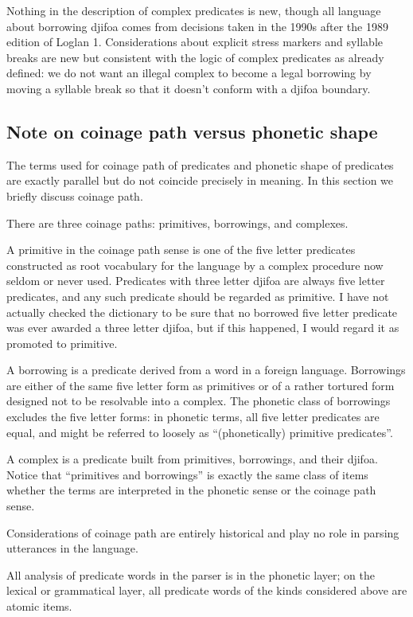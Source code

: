 \documentclass[12pt]{book}
\begin{document}
Nothing in the description of complex predicates is new, though all language about borrowing djifoa comes from decisions taken in the 1990s after the 1989 edition of Loglan 1.  Considerations about explicit stress markers and syllable breaks are new but consistent with the logic of complex predicates as already defined:  we do not want an illegal complex to become a legal borrowing by moving a syllable break so that it doesn't conform with a djifoa boundary.  

\subsection{Note on coinage path versus phonetic shape}

The terms used for coinage path of predicates and phonetic shape of predicates are exactly parallel but do not coincide precisely in meaning.  In this section we
briefly discuss coinage path.

There are three coinage paths:  primitives, borrowings, and complexes.

A primitive in the coinage path sense is one of the five letter predicates constructed as root vocabulary for the language by a complex procedure now seldom or never used.   Predicates with three letter djifoa are always five letter predicates, and any such predicate should be regarded as primitive.  I have not actually checked the dictionary to be sure that no borrowed five letter predicate was ever awarded a three letter djifoa, but if this happened, I would regard it as promoted to primitive.

A borrowing is a predicate derived from a word in a foreign language.   Borrowings are either of the same five letter form as primitives or of a rather tortured form designed not to be resolvable into a complex.   The phonetic class of borrowings excludes the five letter forms:  in phonetic terms,
all five letter predicates are equal, and might be referred to loosely as ``(phonetically) primitive predicates''.

A complex is a predicate built from primitives, borrowings, and their djifoa.  Notice that ``primitives and borrowings'' is exactly the same class of items whether the terms are interpreted in the phonetic sense or the coinage path sense.

Considerations of coinage path are entirely historical and play no role in parsing utterances in the language.

All analysis of predicate words in the parser is in the phonetic layer;  on the lexical or grammatical layer, all predicate words of the kinds considered above are atomic items.
\end{document}

